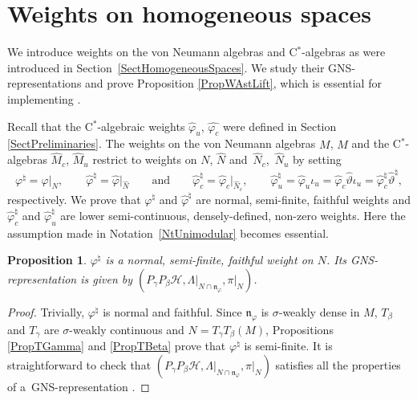 \documentclass[pdftex]{sigma}
\numberwithin{equation}{section}
\newtheorem{prop}[thm]{Proposition}
\theoremstyle{definition}
\newcommand{\cHil}{\mathcal{H}}
\newcommand{\nphi}{\mathfrak{n}_\varphi}
\begin{document}
\section{Weights on homogeneous spaces}\label{SectWeights}

We introduce weights on the von Neumann algebras and C$^\ast$-algebras as were introduced in Section~\ref{SectHomogeneousSpaces}. We study their GNS-representations and prove Proposition \ref{PropWAstLift}, which is essential for implementing \cite[Theorem~3.4.5]{Des}.



Recall that the C$^\ast$-algebraic weights $\hat{\varphi}_u$, $\hat{\varphi_c}$ were def\/ined in  Section \ref{SectPreliminaries}.
The weights on the von Neumann algebras $M$, $\hat{M}$ and the C$^\ast$-algebras $\hat{M}_c$, $\hat{M}_u$ restrict to weights on $N$, $\hat{N}$ and~$\hat{N}_c$,~$\hat{N}_u$ by setting
\[
\varphi^\natural = \varphi \vert _N, \qquad \hat{\varphi}^\natural = \hat{\varphi} \vert_{\hat{N}} \qquad \textrm{and} \qquad \hat{\varphi}_c^\natural = \hat{\varphi}_c\vert_{\hat{N}_c},\qquad \hat{\varphi}_u^\natural = \hat{\varphi}_u \iota_u = \hat{\varphi}_c \hat{\vartheta} \iota_u = \hat{\varphi}_c^\natural \hat{\vartheta}^\natural,
\]
 respectively. We prove that $\varphi^\natural$ and $\hat{\varphi}^\natural$ are normal, semi-f\/inite, faithful weights  and $\hat{\varphi}_c^\natural$ and $\hat{\varphi}_u^\natural$ are lower semi-continuous, densely-def\/ined, non-zero weights. Here the assumption made in Notation~\ref{NtUnimodular} becomes essential.

\begin{prop}\label{PropNormalWeightVNA}
$\varphi^\natural$ is a normal, semi-finite, faithful weight on $N$. Its GNS-representation is given by $(P_\gamma P_\beta \cHil, \Lambda \vert_{N \cap \nphi}, \pi\vert_N)$.
\end{prop}
\begin{proof}
Trivially, $\varphi^\natural$ is normal and faithful. Since $\nphi$ is $\sigma$-weakly dense in $M$, $T_\beta$ and $T_\gamma$ are $\sigma$-weakly continuous and $N = T_\gamma T_\beta(M)$, Propositions \ref{PropTGamma} and \ref{PropTBeta} prove that $\varphi^\natural$ is semi-f\/inite. It is straightforward to check that $(P_\gamma P_\beta \cHil, \Lambda \vert_{N \cap \nphi}, \pi\vert_N)$ satisf\/ies all the properties of a~GNS-representation \cite[Section VII.1]{TakII}.
\end{proof}
\end{document}
